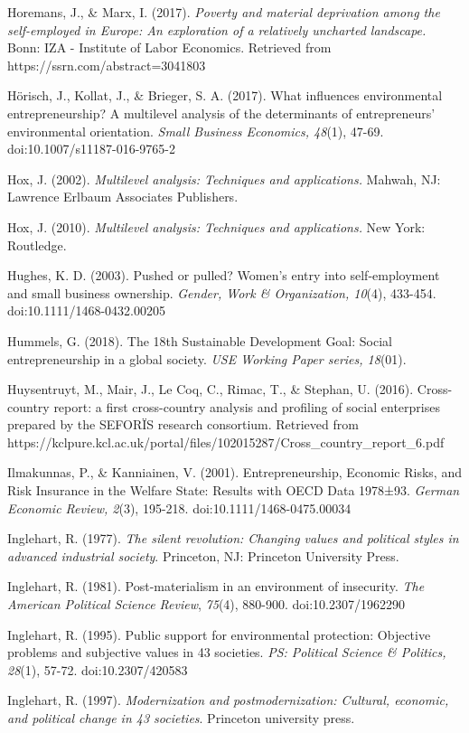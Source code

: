 \documentclass{article}
\begin{document}
Horemans, J., \& Marx, I. (2017). \emph{Poverty and material deprivation among the self-employed in Europe: An exploration of a relatively uncharted landscape.} Bonn: IZA - Institute of Labor Economics. Retrieved from https://ssrn.com/abstract=3041803 

Hörisch, J., Kollat, J., \& Brieger, S. A. (2017). What influences environmental entrepreneurship? A multilevel analysis of the determinants of entrepreneurs' environmental orientation. \emph{Small Business Economics, 48}(1), 47-69. doi:10.1007/s11187-016-9765-2

Hox, J. (2002). \emph{Multilevel analysis: Techniques and applications. }Mahwah, NJ: Lawrence Erlbaum Associates Publishers.

Hox, J. (2010). \emph{Multilevel analysis: Techniques and applications. }New York: Routledge.

Hughes, K. D. (2003). Pushed or pulled? Women's entry into self-employment and small business ownership. \emph{Gender, Work \& Organization, 10}(4), 433-454. doi:10.1111/1468-0432.00205

Hummels, G. (2018). The 18th Sustainable Development Goal: Social entrepreneurship in a global society. \emph{USE Working Paper series, 18}(01). 

Huysentruyt, M., Mair, J., Le Coq, C., Rimac, T., \& Stephan, U. (2016). Cross-country report: a first cross-country analysis and profiling of social enterprises prepared by the SEFORÏS research consortium. Retrieved from https://kclpure.kcl.ac.uk/portal/files/102015287/Cross\_country\_report\_6.pdf

Ilmakunnas, P., \& Kanniainen, V. (2001). Entrepreneurship, Economic Risks, and Risk Insurance in the Welfare State: Results with OECD Data 1978±93. \emph{German Economic Review, 2}(3), 195-218. doi:10.1111/1468-0475.00034

Inglehart, R. (1977). \emph{The silent revolution: Changing values and political styles in advanced industrial society}. Princeton, NJ: Princeton University Press.

Inglehart, R. (1981). Post-materialism in an environment of insecurity. \emph{The American Political Science Review}, \emph{75}(4), 880-900. doi:10.2307/1962290

Inglehart, R. (1995). Public support for environmental protection: Objective problems and subjective values in 43 societies. \emph{PS: Political Science \& Politics, 28}(1), 57-72. doi:10.2307/420583

Inglehart, R. (1997). \emph{Modernization and }\emph{postmodernization}\emph{: Cultural, economic, and political change in 43 societies}. Princeton university press.
\end{document}
